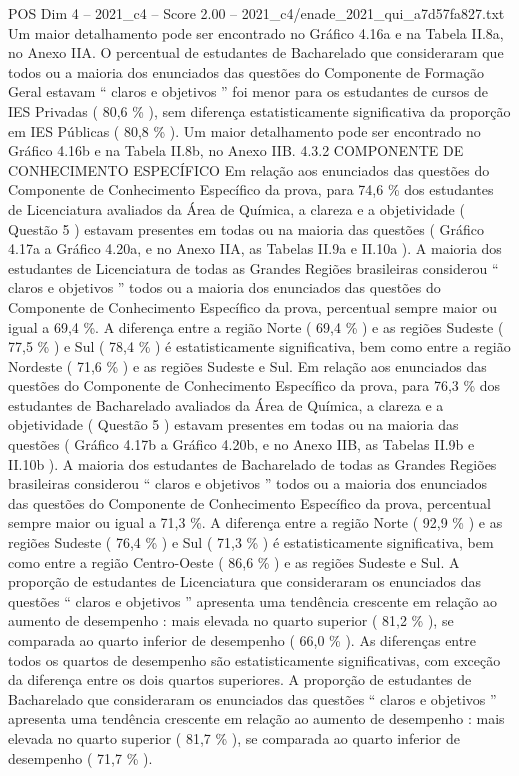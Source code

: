 \begin{textsample}{POS Dim 4 – 2021\_c4 – Score 2.00 – 2021\_c4/enade\_2021\_qui\_a7d57fa827.txt}
Um maior detalhamento pode ser encontrado no Gráfico 4.16a e na Tabela II.8a, no Anexo IIA.
O percentual de estudantes de Bacharelado que consideraram que todos ou a maioria dos enunciados das questões do Componente de Formação Geral estavam “ claros e objetivos ” foi menor para os estudantes de cursos de IES Privadas ( 80,6 \% ), sem diferença estatisticamente significativa da proporção em IES Públicas ( 80,8 \% ).
Um maior detalhamento pode ser encontrado no Gráfico 4.16b e na Tabela II.8b, no Anexo IIB. 4.3.2 COMPONENTE DE CONHECIMENTO ESPECÍFICO Em relação aos enunciados das questões do Componente de Conhecimento Específico da prova, para 74,6 \% dos estudantes de Licenciatura avaliados da Área de Química, a clareza e a objetividade ( Questão 5 ) estavam presentes em todas ou na maioria das questões ( Gráfico 4.17a a Gráfico 4.20a, e no Anexo IIA, as Tabelas II.9a e II.10a ).
A maioria dos estudantes de Licenciatura de todas as Grandes Regiões brasileiras considerou “ claros e objetivos ” todos ou a maioria dos enunciados das questões do Componente de Conhecimento Específico da prova, percentual sempre maior ou igual a 69,4 \%.
A diferença entre a região Norte ( 69,4 \% ) e as regiões Sudeste ( 77,5 \% ) e Sul ( 78,4 \% ) é estatisticamente significativa, bem como entre a região Nordeste ( 71,6 \% ) e as regiões Sudeste e Sul.
Em relação aos enunciados das questões do Componente de Conhecimento Específico da prova, para 76,3 \% dos estudantes de Bacharelado avaliados da Área de Química, a clareza e a objetividade ( Questão 5 ) estavam presentes em todas ou na maioria das questões ( Gráfico 4.17b a Gráfico 4.20b, e no Anexo IIB, as Tabelas II.9b e II.10b ).
A maioria dos estudantes de Bacharelado de todas as Grandes Regiões brasileiras considerou “ claros e objetivos ” todos ou a maioria dos enunciados das questões do Componente de Conhecimento Específico da prova, percentual sempre maior ou igual a 71,3 \%.
A diferença entre a região Norte ( 92,9 \% ) e as regiões Sudeste ( 76,4 \% ) e Sul ( 71,3 \% ) é estatisticamente significativa, bem como entre a região Centro-Oeste ( 86,6 \% ) e as regiões Sudeste e Sul.
A proporção de estudantes de Licenciatura que consideraram os enunciados das questões “ claros e objetivos ” apresenta uma tendência crescente em relação ao aumento de desempenho : mais elevada no quarto superior ( 81,2 \% ), se comparada ao quarto inferior de desempenho ( 66,0 \% ).
As diferenças entre todos os quartos de desempenho são estatisticamente significativas, com exceção da diferença entre os dois quartos superiores.
A proporção de estudantes de Bacharelado que consideraram os enunciados das questões “ claros e objetivos ” apresenta uma tendência crescente em relação ao aumento de desempenho : mais elevada no quarto superior ( 81,7 \% ), se comparada ao quarto inferior de desempenho ( 71,7 \% ).

\end{textsample}
